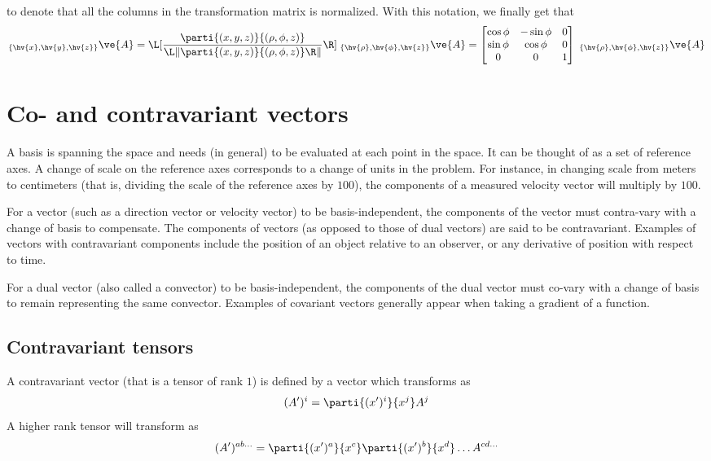\documentclass[a4paper, 12pt]{article}
\begin{document}
%
to denote that all the columns in the transformation matrix is normalized. With 
this notation, we finally get that
%
\begin{align*}
 _{\{\hv{x}, \hv{y}, \hv{z}\}} \ve{A}
  =
    \L[
     \frac{\displaystyle \parti{(x, y, z)}{(\rho, \phi, z)}}{
           \displaystyle \L\|\parti{(x,y, z)}{(\rho, \phi, z)}\R\| } \R] \;
   _{\{\hv{\rho}, \hv{\phi},\hv{z}\}}\ve{A}
  = \begin{bmatrix} \cos\phi & -\sin\phi & 0 \\
                    \sin\phi &  \cos\phi & 0 \\
                    0 & 0 & 1
 \end{bmatrix} \;
 _{\{\hv{\rho}, \hv{\phi},\hv{z}\}}\ve{A}
\end{align*}



\section{Co- and contravariant vectors}
A basis is spanning the space and needs (in general) to be evaluated at each 
point in the space. It can be thought of as a set of reference axes.
A change of scale on the reference axes corresponds to a change of units in the 
problem. For instance, in changing scale from meters to centimeters (that is, 
dividing the scale of the reference axes by $100$), the components of a 
measured velocity vector will multiply by $100$.

For a vector (such as a direction vector or velocity vector) to be 
basis-independent, the components of the vector must contra-vary with a change 
of basis to compensate. The components of vectors (as opposed to those of dual 
vectors) are said to be contravariant. Examples of vectors with contravariant 
components include the position of an object relative to an observer, or any 
derivative of position with respect to time.

For a dual vector (also called a convector) to be basis-independent, the 
components of the dual vector must co-vary with a change of basis to remain 
representing the same convector. Examples of covariant vectors generally appear 
when taking a gradient of a function.





\subsection{Contravariant tensors}
A contravariant vector (that is a tensor of rank $1$) is defined by a vector 
which transforms as
%
\begin{align*}
 (A')^i = \parti{(x')^i}{x^j} A^j
\end{align*}
%
A higher rank tensor will transform as
%
\begin{align*}
 (A')^{ab\ldots} = \parti{(x')^{a}}{x^{c}}\parti{(x')^{b}}{x^{d}}\ldots 
A^{cd\ldots}
\end{align*}
%
\end{document}
